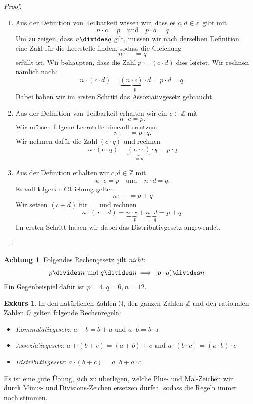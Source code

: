 \documentclass[a4paper,ngerman,12pt]{scrartcl}
\newcommand{\N}{\mathbb{N}}
\newcommand{\Z}{\mathbb{Z}}
\newcommand{\Q}{\mathbb{Q}}
\newcommand{\leer}{\underline{\;\;\;\;}}
\theoremstyle{definition}
\newtheorem*{exk}{Exkurs}
\newtheorem*{acht}{Achtung}
\newenvironment{exkurs}{\begin{shaded}\begin{exk}}{\end{exk}\end{shaded}}
\newenvironment{beweisliste}{\begin{enumerate}[Zu (i):]}{\end{enumerate}}
\begin{document}
\begin{proof}
  \begin{beweisliste}
    \item Aus der Definition von Teilbarkeit wissen wir, dass es $c, d \in \Z$ gibt mit
    \[ n \cdot c = p \quad \text{und} \quad p \cdot d = q \]
    Um zu zeigen, dass $n \divides q$ gilt, müssen wir nach derselben Definition eine Zahl für die Leerstelle finden, sodass die Gleichung
    \[ n \cdot \leer = q \]
    erfüllt ist. Wir behaupten, dass die Zahl $p \coloneqq (c \cdot d)$ dies leistet. Wir rechnen nämlich nach:
    \[ n \cdot (c \cdot d) = \underbrace{(n \cdot c)}_{= p} \cdot d = p \cdot d = q. \]
    Dabei haben wir im ersten Schritt das Assoziativgesetz gebraucht.
    \item Aus der Definition von Teilbarkeit erhalten wir ein $c \in \Z$ mit
    \[ n \cdot c = p. \]
    Wir müssen folgene Leerstelle sinnvoll ersetzen:
    \[ n \cdot \leer = p \cdot q. \]
    Wir nehmen dafür die Zahl $(c \cdot q)$ und rechnen
    \[ n \cdot (c \cdot q) = \underbrace{(n \cdot c)}_{= p} \cdot q = p \cdot q \]
    \item Aus der Definition erhalten wir $c, d \in \Z$ mit
    \[ n \cdot c = p \quad \text{und} \quad n \cdot d = q. \]
    Es soll folgende Gleichung gelten:
    \[ n \cdot \leer = p + q \]
    Wir setzen $(c+d)$ für $\leer$ und rechnen
    \[ n \cdot (c+d) = \underbrace{n \cdot c}_{= p} + \underbrace{n \cdot d}_{= q} = p + q. \]
    Im ersten Schritt haben wir dabei das Distributivgesetz angewendet.
  \end{beweisliste}
\end{proof}

\begin{acht}
  Folgendes Rechengesetz gilt \emph{nicht}:
  \[ p \divides n \text{ und } q \divides n \implies (p \cdot q) \divides n \]
  Ein Gegenbeispiel dafür ist $p = 4, q = 6, n = 12$.
\end{acht}

\begin{exkurs}
  In den natürlichen Zahlen $\N$, den ganzen Zahlen $\Z$ und den rationalen Zahlen $\Q$ gelten folgende Rechenregeln:
  \begin{itemize}
    \item \emph{Kommutativgesetz}: $a + b = b + a$ und $a \cdot b = b \cdot a$
    \item \emph{Assoziativgesetz}: $a + (b + c) = (a + b) + c$ und $a \cdot (b \cdot c) = (a \cdot b) \cdot c$
    \item \emph{Distributivgesetz}: $a \cdot (b + c) = a \cdot b + a \cdot c$
  \end{itemize}
  Es ist eine gute Übung, sich zu überlegen, welche Plus- und Mal-Zeichen wir durch Minus- und Divisions-Zeichen ersetzen dürfen, sodass die Regeln immer noch stimmen.
\end{exkurs}
\end{document}

